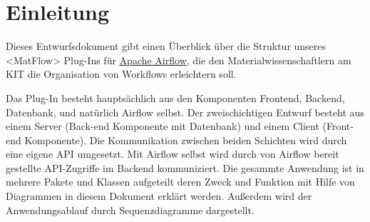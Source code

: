 \section{Einleitung}


Dieses Entwurfsdokument gibt einen Überblick über die Struktur unseres <MatFlow> Plug-Ins für \href{https://airflow.apache.org}{Apache Airflow}, die den Materialwissenschaftlern am KIT die Organisation von Workflows erleichtern soll.

Das Plug-In besteht hauptsächlich aus den Komponenten Frontend, Backend, Datenbank, und natürlich Airflow selbst. Der zweischichtigen Entwurf besteht aus einem Server (Back-end Komponente mit Datenbank) und einem Client (Front-end Komponente). Die Kommunikation zwischen beiden Schichten wird durch eine eigene API umgesetzt. Mit Airflow selbst wird durch von Airflow bereit gestellte API-Zugriffe im Backend kommuniziert.
Die gesammte Anwendung ist in mehrere Pakete und Klassen aufgeteilt deren Zweck und  Funktion mit Hilfe von Diagrammen in diesem Dokument erklärt werden. Außerdem wird der Anwendungsablauf durch Sequenzdiagramme dargestellt.


\newpage